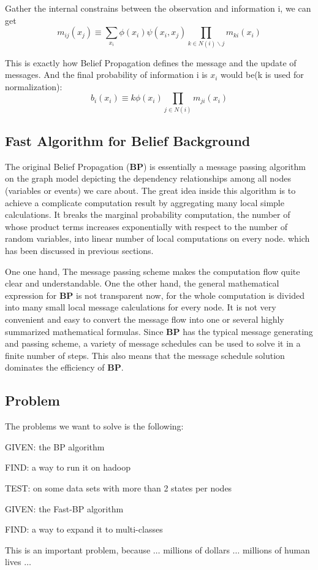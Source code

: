 Gather the internal constrains between the observation and information i, we can get
$$m_{ij}(x_j) \equiv \sum_{x_i} {\phi(x_i) \psi(x_i, x_j) \prod_{k \in N(i) \backslash j}{m_{ki}(x_i)}}$$

This is exactly how Belief Propagation defines the message and the update of messages\cite{UBP}. And the final probability of information i is $x_i$ would be(k is used for normalization):
$$b_i(x_i) \equiv k\phi(x_i)\prod_{j \in N(i)} m_{ji}(x_i)$$

\subsection{Fast Algorithm for Belief Background}
The original Belief Propagation (\textbf{BP}) is essentially a message passing algorithm on the graph model depicting the dependency relationships among all nodes (variables or events) we care about. The great idea inside this algorithm is to achieve a complicate computation result by aggregating many local simple calculations. It breaks the marginal probability computation, the number of whose product terms increases exponentially with respect to the number of random variables, into linear number of local computations on every node. which has been discussed in previous sections.

One one hand, The message passing scheme makes the computation flow quite clear and understandable. One the other hand, the general mathematical expression for \textbf{BP} is not transparent now, for the whole computation is divided into many small local message calculations for every node. It is not very convenient and easy to convert the message flow into one or several highly summarized mathematical formulas. Since \textbf{BP} has the typical message generating and passing scheme, a variety of message schedules can be used to solve it in a finite number of steps. This also means that the message schedule solution dominates the efficiency of \textbf{BP}.

\subsection{Problem}

The problems we want to solve is the following:
\bit
\item GIVEN: the BP algorithm
\item FIND: a way to run it on hadoop
\item TEST: on some data sets with more than 2 states per nodes
\eit

\bit
\item GIVEN: the Fast-BP algorithm
\item FIND: a way to expand it to multi-classes
\eit

This is an important problem, because $\ldots$
millions of dollars $\ldots$
millions of human lives $\ldots$
